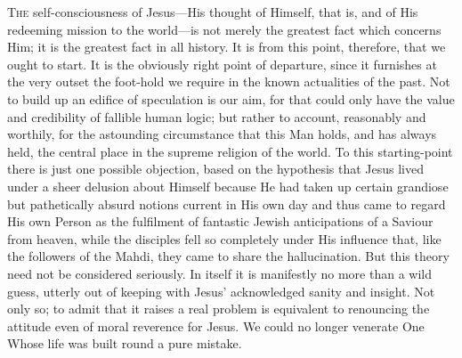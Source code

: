 \documentclass[12pt,a5paper,oneside]{book}
\begin{document}
\textsc{The} self-consciousness of Jesus---His thought of
Himself, that is, and of His redeeming mission to
the world---is not merely the greatest fact which
concerns Him; it is the greatest fact in all
history. It is from this point, therefore, that
we ought to start. It is the obviously right
point of departure, since it furnishes at the
very outset the foot-hold we require in the
known actualities of the past. Not to build
up an edifice of speculation is our aim, for that
could only have the value and credibility of
fallible human logic; but rather to account,
reasonably and worthily, for the astounding
circumstance that this Man holds, and has
always held, the central place in the supreme
religion of the world. To this starting-point
there is just one possible objection, based on
the hypothesis that Jesus lived under a sheer
delusion about Himself because He had taken
up certain grandiose but pathetically absurd
notions current in His own day and thus
came to regard His own Person as the fulfilment 
of fantastic Jewish anticipations of
a Saviour from heaven, while the disciples fell
so completely under His influence that, like the
followers of the Mahdi, they came to share the
hallucination. But this theory need not be considered 
seriously. In itself it is manifestly no
more than a wild guess, utterly out of keeping
with Jesus' acknowledged sanity and insight.
Not only so; to admit that it raises a real problem 
is equivalent to renouncing the attitude
even of moral reverence for Jesus. We could
no longer venerate One Whose life was built
round a pure mistake.
\end{document}
